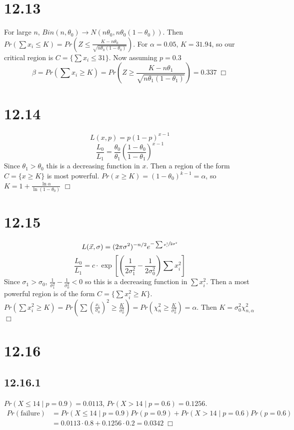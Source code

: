 \documentclass{article}
\begin{document}
\section*{12.13}
For large $n$, $Bin(n,\theta_0) \rightarrow N(n\theta_0, n\theta_0(1-\theta_0))$. Then $Pr(\sum x_i \leqslant K) = Pr(Z \leqslant \frac{K - n\theta_0}{\sqrt{n\theta_0(1-\theta_0)}})$. For $\alpha = 0.05$, $K = 31.94$, so our critical region is $C = \{\sum x_i \leqslant 31\}$. Now assuming $p = 0.3$
$$\beta = Pr(\sum x_i \geqslant K) = Pr(Z \geqslant \frac{K - n\theta_1}{\sqrt{n\theta_1(1-\theta_1)}}) = 0.337 \;\Box$$

\section*{12.14}
$$L(x, p) = p(1-p)^{x-1}$$
$$\frac{L_0}{L_1} = \frac{\theta_0}{\theta_1} \left(\frac{1-\theta_0}{1-\theta_1}\right)^{x-1}$$
Since $\theta_1 > \theta_0$ this is a decreasing function in $x$. Then a region of the form $C = \{x \geqslant K\}$ is most powerful. $Pr(x \geq K) = (1-\theta_0)^{k-1} = \alpha$, so $K = 1 + \frac{\ln\alpha}{\ln(1-\theta_0)}$ $\Box$

\section*{12.15}
$$L(\vec{x}, \sigma) = (2\pi\sigma^2)^{-n/2} e^{-\sfrac{\sum x_i^2}{2\sigma^2}}$$
$$\frac{L_0}{L_1} = c \cdot \exp\left[\left(\frac{1}{2\sigma_1^2} - \frac{1}{2\sigma_0^2}\right)\sum x_i^2\right]$$
Since $\sigma_1 > \sigma_0$, $\frac{1}{\sigma_1^2} - \frac{1}{\sigma_0^2} < 0$ so this is a decreasing function in $\sum x_i^2$. Then a most powerful region is of the form $C = \{\sum x_i^2 \geqslant K\}$. $Pr(\sum x_i^2 \geqslant K) = Pr(\sum \left(\frac{x_i}{\sigma_0}\right)^2 \geqslant \frac{K}{\sigma_0^2}) = Pr(\chi^2_n \geqslant \frac{K}{\sigma_0^2}) = \alpha$. Then $K = \sigma_0^2 \chi^2_{n,\alpha}$ $\Box$

\section*{12.16}
\subsection*{12.16.1}
$Pr(X \leqslant 14 \;|\; p = 0.9) = 0.0113$, $Pr(X > 14 \;|\; p = 0.6) = 0.1256$.
\begin{equation*}
\begin{split}
  Pr(\text{failure}) &= Pr(X \leqslant 14 \;|\; p = 0.9) Pr(p = 0.9) + Pr(X > 14 \;|\; p = 0.6) Pr(p = 0.6)\\
  &= 0.0113\cdot 0.8 + 0.1256\cdot 0.2 = 0.0342 \;\Box
\end{split}
\end{equation*}
\end{document}
